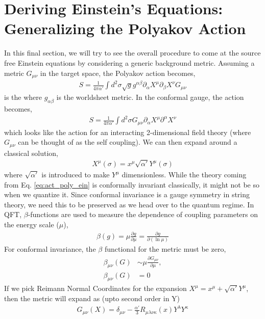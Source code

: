 \documentclass{article}
\begin{document}
\section{Deriving Einstein's Equations: Generalizing the Polyakov Action}
In this final section, we will try to see the overall procedure to come at the source free Einstein equations by considering a generic background metric. Assuming a metric $G_{\mu\nu}$ in the target space, the Polyakov action becomes,
\begin{align}
    S=\frac{1}{4\pi\alpha'}\int d^2\sigma \sqrt{g}g^{\alpha\beta} \partial_\alpha X^\mu\partial_\beta X^\nu G_{\mu\nu}
\end{align} is the 
where $g_{\alpha\beta}$ is the worldsheet metric. In the conformal gauge, the action becomes,
\begin{align}
    S=\frac{1}{4\pi\alpha'}\int d^2\sigma G_{\mu\nu}\partial_\alpha X^\mu\partial^\alpha X^\nu\label{eq:act_poly_ein}
\end{align}
which looks like the action for an interacting 2-dimensional field theory (where $G_{\mu\nu}$ can be thought of as the self coupling). We can then expand around a classical solution,
\begin{align}
    X^\mu(\sigma)=x^\mu \sqrt{\alpha'}Y^\mu(\sigma)
\end{align}
where $\sqrt{\alpha'}$ is introduced to make $Y^\mu$ dimensionless. While the theory coming from Eq. \eqref{eq:act_poly_ein} is conformally invariant classically, it might not be so when we quantize it. Since conformal invariance is a gauge symmetry in string theory, we need this to be preserved as we head over to the quantum regime. In QFT, $\beta$-functions are used to measure the dependence of coupling parameters on the energy scale ($\mu$),
\begin{align}
    \beta(g) = \mu\frac{\partial g}{\partial \mu} = \frac{\partial g}{\partial(\ln\mu)}
\end{align}
For conformal invariance, the $\beta$ functional for the metric must be zero,
\begin{align}
    \beta_{\mu\nu}(G)&\sim \mu\frac{\partial G_{\mu\nu}}{\partial\mu},\\
    \beta_{\mu\nu}(G)&=0
\end{align}
If we pick Reimann Normal Coordinates for the expansion $X^\mu=x^\mu+\sqrt{\alpha'}Y^\mu$, then the metric will expand as (upto second order in Y)
\begin{align}
    G_{\mu\nu}(X)=\delta_{\mu\nu}-\frac{\alpha'}{3}R_{\mu\lambda\nu\kappa}(x)Y^\lambda Y^\kappa
\end{align}
\end{document}
